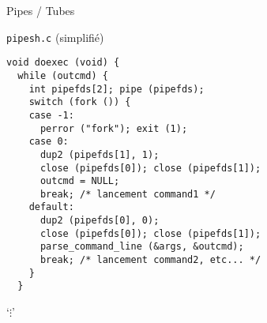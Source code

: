 \documentclass[11pt]{beamer}
\begin{document}
\begin{slide}{Pipes / Tubes}
\vspace*{-.1in}
\end{slide}

\begin{slide}{\texttt{pipesh.c} (simplifié)}
  \small
  \begin{verbatim}
void doexec (void) {
  while (outcmd) {
    int pipefds[2]; pipe (pipefds);
    switch (fork ()) {
    case -1:
      perror ("fork"); exit (1);
    case 0:
      dup2 (pipefds[1], 1);
      close (pipefds[0]); close (pipefds[1]);
      outcmd = NULL;
      break; /* lancement command1 */
    default:
      dup2 (pipefds[0], 0);
      close (pipefds[0]); close (pipefds[1]);
      parse_command_line (&args, &outcmd);
      break; /* lancement command2, etc... */
    }
  }
\end{verbatim}
  `$\vdots$'
\end{slide}
\end{document}
